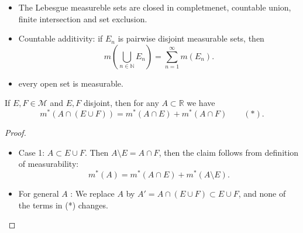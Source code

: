 
\begin{theorem}
\begin{itemize}
	\item 
	The Lebesgue measureble sets are closed in completmenet, countable union, finite intersection and set exclusion.
\item Countable additivity: if $E_n$ is pairwise disjoint measurable sets, then
	\[
		m\left( \bigcup_{n \in \mathbb{N}} E_n \right)  = \sum_{n=1}^{\infty} m(E_n)
	.\] 
\item every open set is measurable.
\end{itemize}
\end{theorem}

\begin{lemma}
	If $E, F \in \mathcal{M}$ and $E, F$ disjoint, then for any $A \subset \mathbb{R}$ we have
	\[
		m^*\left( A \cap (E \cup F) \right)  = m^* (A \cap E) + m^* (A \cap F) \qquad (*)
	.\] 
\end{lemma}
\begin{proof}
	\begin{itemize}
		\item Case 1: $A \subset E \cup F$. Then $A \setminus  E = A \cap F$, then the claim follows from definition of measurability:
			\[
				m^*(A) = m^*(A \cap E) + m^*(A \setminus E)
			.\] 
		\item For general $A$ : We replace $A $ by $A' = A \cap (E \cup F) \subset E \cup F$, and none of the terms in (*) changes.
	\end{itemize}
\end{proof}

